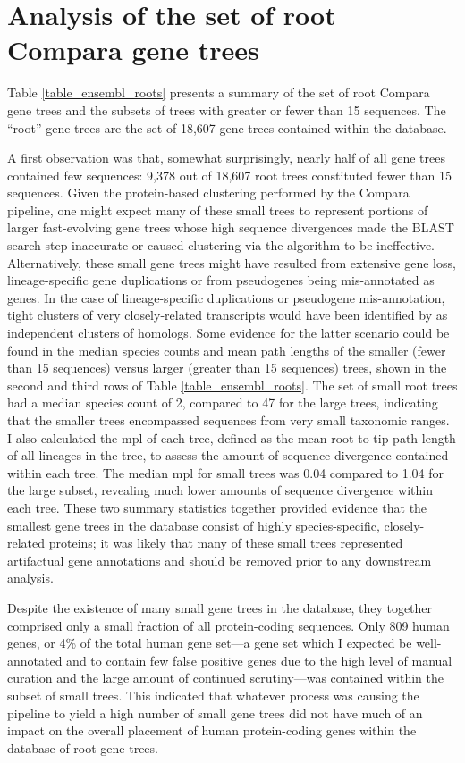 \section{Analysis of the set of root Compara gene trees}
\label{section_root_compara_trees}

Table \ref{table_ensembl_roots} presents a summary of the set of root
Compara gene trees and the subsets of trees with greater or fewer than
15 sequences. The ``root'' gene trees are the set of 18,607 gene trees
contained within the \ens \cmp database.

A first observation was that, somewhat surprisingly, nearly half of
all \cmp gene trees contained few sequences: 9,378 out of 18,607 root
trees constituted fewer than 15 sequences. Given the protein-based
clustering performed by the Compara pipeline, one might expect many of
these small trees to represent portions of larger fast-evolving gene
trees whose high sequence divergences made the BLAST search step
inaccurate or caused clustering via the \hclust algorithm to be
ineffective. Alternatively, these small gene trees might have resulted
from extensive gene loss, lineage-specific gene duplications or from
pseudogenes being mis-annotated as genes. In the case of
lineage-specific duplications or pseudogene mis-annotation, tight
clusters of very closely-related transcripts would have been
identified by \hclust as independent clusters of homologs. Some
evidence for the latter scenario could be found in the median species
counts and mean path lengths of the smaller (fewer than 15 sequences)
versus larger (greater than 15 sequences) trees, shown in the second
and third rows of Table \ref{table_ensembl_roots}. The set of small
root trees had a median species count of 2, compared to 47 for the
large trees, indicating that the smaller trees encompassed sequences
from very small taxonomic ranges. I also calculated the \ac{mpl} of
each tree, defined as the mean root-to-tip path length of all lineages
in the tree, to assess the amount of sequence divergence contained
within each tree. The median \ac{mpl} for small trees was 0.04
compared to 1.04 for the large subset, revealing much lower amounts of
sequence divergence within each tree. These two summary statistics
together provided evidence that the smallest gene trees in the \cmp
database consist of highly species-specific, closely-related proteins;
it was likely that many of these small trees represented artifactual
gene annotations and should be removed prior to any downstream
analysis.

Despite the existence of many small gene trees in the \cmp database,
they together comprised only a small fraction of all protein-coding
sequences. Only 809 human genes, or 4\% of the total human gene
set---a gene set which I expected be well-annotated and to contain few
false positive genes due to the high level of manual curation and the
large amount of continued scrutiny---was contained within the subset
of small trees. This indicated that whatever process was causing the
\cmp pipeline to yield a high number of small gene trees did not have
much of an impact on the overall placement of human protein-coding
genes within the database of root \cmp gene trees.


